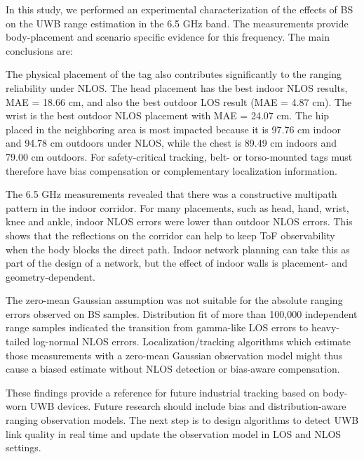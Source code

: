 In this study, we performed an experimental characterization of the effects of BS on the UWB range estimation in the 6.5 GHz band. The measurements provide body-placement and scenario specific evidence for this frequency. The main conclusions are:

The physical placement of the tag also contributes significantly to the ranging reliability under NLOS. The head placement has the best indoor NLOS results, MAE = 18.66 cm, and also the best outdoor LOS result (MAE = 4.87 cm). The wrist is the best outdoor NLOS placement with MAE = 24.07 cm. The hip placed in the neighboring area is most impacted because it is 97.76 cm indoor and 94.78 cm outdoors under NLOS, while the chest is 89.49 cm indoors and 79.00 cm outdoors. For safety-critical tracking, belt- or torso-mounted tags must therefore have bias compensation or complementary localization information.

The 6.5 GHz measurements revealed that there was a constructive multipath pattern in the indoor corridor. For many placements, such as head, hand, wrist, knee and ankle, indoor NLOS errors were lower than outdoor NLOS errors. This shows that the reflections on the corridor can help to keep ToF observability when the body blocks the direct path. Indoor network planning can take this as part of the design of a network, but the effect of indoor walls is placement- and geometry-dependent.

The zero-mean Gaussian assumption was not suitable for the absolute ranging errors observed on BS samples. Distribution fit of more than 100,000 independent range samples indicated the transition from gamma-like LOS errors to heavy-tailed log-normal NLOS errors. Localization/tracking algorithms which estimate those measurements with a zero-mean Gaussian observation model might thus cause a biased estimate without NLOS detection or bias-aware compensation.

These findings provide a reference for future industrial tracking based on body-worn UWB devices. Future research should include bias and distribution-aware ranging observation models. The next step is to design algorithms to detect UWB link quality in real time and update the observation model in LOS and NLOS settings.